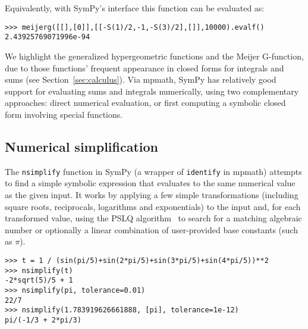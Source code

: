 Equivalently, with SymPy's interface this function can be evaluated as:
\begin{verbatim}
>>> meijerg([[],[0]],[[-S(1)/2,-1,-S(3)/2],[]],10000).evalf()
2.43925769071996e-94
\end{verbatim}

We highlight the generalized hypergeometric functions and the Meijer
G-function, due to those functions' frequent appearance in closed forms for
integrals and sums (see Section~\ref{sec:calculus}). Via mpmath, SymPy has
relatively good support for evaluating sums and integrals numerically, using
two complementary approaches: direct numerical evaluation, or first computing
a symbolic closed form involving special functions.

\subsection{Numerical simplification}

The \texttt{nsimplify} function in SymPy
(a wrapper of \texttt{identify} in mpmath)
attempts to find a simple symbolic
expression that evaluates to the same numerical value as the given
input.
It works by applying a few simple transformations
(including square roots, reciprocals, logarithms and exponentials) to
the input and, for each transformed value,
using the PSLQ algorithm~\cite{Ferguson1999} to search for
a matching algebraic number or optionally a linear combination
of user-provided base constants (such as $\pi$).

\begin{verbatim}
>>> t = 1 / (sin(pi/5)+sin(2*pi/5)+sin(3*pi/5)+sin(4*pi/5))**2
>>> nsimplify(t)
-2*sqrt(5)/5 + 1
>>> nsimplify(pi, tolerance=0.01)
22/7
>>> nsimplify(1.783919626661888, [pi], tolerance=1e-12)
pi/(-1/3 + 2*pi/3)
\end{verbatim}
